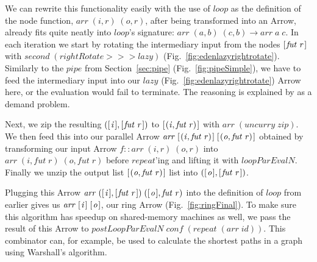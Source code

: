 \documentclass{jfp1}
\newcommand{\Varid}[1]{\mathit{#1}}
\renewcommand{\cite}[1]{\citep{#1}}
\begin{document}
We can rewrite this functionality easily with the use of \ensuremath{\Varid{loop}} as the definition of the node function, \ensuremath{\Varid{arr}\;(\Varid{i},\Varid{r})\;(\Varid{o},\Varid{r})}, after being transformed into an Arrow, already fits quite neatly into \ensuremath{\Varid{loop}}'s signature: \ensuremath{\Varid{arr}\;(\Varid{a},\Varid{b})\;(\Varid{c},\Varid{b})\to \Varid{arr}\;\Varid{a}\;\Varid{c}}. In each iteration we start by rotating the intermediary input from the nodes \ensuremath{[\mskip1.5mu \Varid{fut}\;\Varid{r}\mskip1.5mu]} with \ensuremath{\Varid{second}\;(\Varid{rightRotate}\mathbin{>\!\!>\!\!>}\Varid{lazy})} (Fig.~\ref{fig:edenlazyrightrotate}). Similarly to the \ensuremath{\Varid{pipe}} from Section~\ref{sec:pipe} (Fig.~\ref{fig:pipeSimple}), we have to feed the intermediary input into our \ensuremath{\Varid{lazy}} (Fig.~\ref{fig:edenlazyrightrotate}) Arrow here, or the evaluation would fail to terminate. The reasoning is explained by \citet{Loogen2012} as a demand problem.

Next, we zip the resulting \ensuremath{([\mskip1.5mu \Varid{i}\mskip1.5mu],[\mskip1.5mu \Varid{fut}\;\Varid{r}\mskip1.5mu])} to \ensuremath{[\mskip1.5mu (\Varid{i},\Varid{fut}\;\Varid{r})\mskip1.5mu]} with \ensuremath{\Varid{arr}\;(\Varid{uncurry}\;\Varid{zip})}. We then feed this into our parallel Arrow \ensuremath{\Varid{arr}\;[\mskip1.5mu (\Varid{i},\Varid{fut}\;\Varid{r})\mskip1.5mu]\;[\mskip1.5mu (\Varid{o},\Varid{fut}\;\Varid{r})\mskip1.5mu]} obtained by transforming our input Arrow \ensuremath{\Varid{f}\mathbin{::}\Varid{arr}\;(\Varid{i},\Varid{r})\;(\Varid{o},\Varid{r})} into \ensuremath{\Varid{arr}\;(\Varid{i},\Varid{fut}\;\Varid{r})\;(\Varid{o},\Varid{fut}\;\Varid{r})} before \ensuremath{\Varid{repeat}}'ing and lifting it with \ensuremath{\Varid{loopParEvalN}}. Finally we unzip the output list \ensuremath{[\mskip1.5mu (\Varid{o},\Varid{fut}\;\Varid{r})\mskip1.5mu]} list into \ensuremath{([\mskip1.5mu \Varid{o}\mskip1.5mu],[\mskip1.5mu \Varid{fut}\;\Varid{r}\mskip1.5mu])}.

Plugging this Arrow \ensuremath{\Varid{arr}\;([\mskip1.5mu \Varid{i}\mskip1.5mu],[\mskip1.5mu \Varid{fut}\;\Varid{r}\mskip1.5mu])\;([\mskip1.5mu \Varid{o}\mskip1.5mu],\Varid{fut}\;\Varid{r})} into the definition of \ensuremath{\Varid{loop}} from earlier gives us \ensuremath{\Varid{arr}\;[\mskip1.5mu \Varid{i}\mskip1.5mu]\;[\mskip1.5mu \Varid{o}\mskip1.5mu]}, our ring Arrow (Fig.~\ref{fig:ringFinal}). To make sure this algorithm has speedup on shared-memory machines as well, we pass the result of this Arrow to \ensuremath{\Varid{postLoopParEvalN}\;\Varid{conf}\;(\Varid{repeat}\;(\Varid{arr}\;\Varid{id}))}.
This combinator can, for example, be used to calculate the shortest paths in a graph using Warshall's algorithm.
\end{document}
